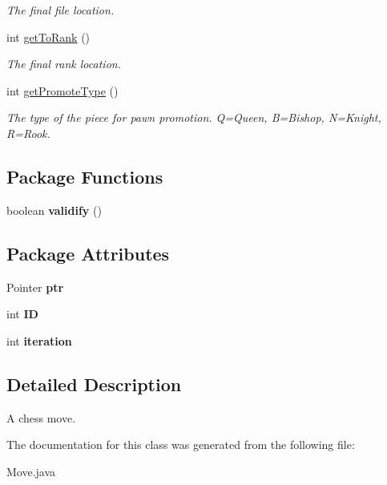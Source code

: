 \begin{DoxyCompactItemize}
\begin{DoxyCompactList}\small\item\em The final file location. \item\end{DoxyCompactList}\item 
\hypertarget{classMove_a7b4311104cb14575da37b5bee6fcb91e}{
int \hyperlink{classMove_a7b4311104cb14575da37b5bee6fcb91e}{getToRank} ()}
\label{classMove_a7b4311104cb14575da37b5bee6fcb91e}

\begin{DoxyCompactList}\small\item\em The final rank location. \item\end{DoxyCompactList}\item 
\hypertarget{classMove_aed2468d2d8a93683bc37ffadcf6524a4}{
int \hyperlink{classMove_aed2468d2d8a93683bc37ffadcf6524a4}{getPromoteType} ()}
\label{classMove_aed2468d2d8a93683bc37ffadcf6524a4}

\begin{DoxyCompactList}\small\item\em The type of the piece for pawn promotion. Q=Queen, B=Bishop, N=Knight, R=Rook. \item\end{DoxyCompactList}\end{DoxyCompactItemize}
\subsection*{Package Functions}
\begin{DoxyCompactItemize}
\item 
\hypertarget{classMove_a8a085577face207a5ddb55f4e4315753}{
boolean {\bfseries validify} ()}
\label{classMove_a8a085577face207a5ddb55f4e4315753}

\end{DoxyCompactItemize}
\subsection*{Package Attributes}
\begin{DoxyCompactItemize}
\item 
\hypertarget{classMove_a4745680989c1e0df2e884989485f3d67}{
Pointer {\bfseries ptr}}
\label{classMove_a4745680989c1e0df2e884989485f3d67}

\item 
\hypertarget{classMove_a0110e682f3e73769bdc15c072ca43775}{
int {\bfseries ID}}
\label{classMove_a0110e682f3e73769bdc15c072ca43775}

\item 
\hypertarget{classMove_af5953bcf67a1c16d57989e83e76b551f}{
int {\bfseries iteration}}
\label{classMove_af5953bcf67a1c16d57989e83e76b551f}

\end{DoxyCompactItemize}


\subsection{Detailed Description}
A chess move. 

The documentation for this class was generated from the following file:\begin{DoxyCompactItemize}
\item 
Move.java\end{DoxyCompactItemize}

